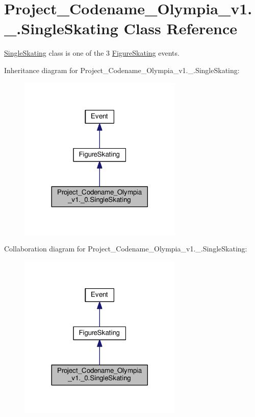 \hypertarget{classProject__Codename__Olympia__v1_1_1__0_1_1SingleSkating}{}\section{Project\+\_\+\+Codename\+\_\+\+Olympia\+\_\+v1.\+\_.\+Single\+Skating Class Reference}
\label{classProject__Codename__Olympia__v1_1_1__0_1_1SingleSkating}


\hyperlink{classProject__Codename__Olympia__v1_1_1__0_1_1SingleSkating}{Single\+Skating} class is one of the 3 \hyperlink{classProject__Codename__Olympia__v1_1_1__0_1_1FigureSkating}{Figure\+Skating} events.  




Inheritance diagram for Project\+\_\+\+Codename\+\_\+\+Olympia\+\_\+v1.\+\_.\+Single\+Skating\+:
\nopagebreak
\begin{figure}[H]
\begin{center}
\leavevmode
\includegraphics[width=221pt]{classProject__Codename__Olympia__v1_1_1__0_1_1SingleSkating__inherit__graph}
\end{center}
\end{figure}


Collaboration diagram for Project\+\_\+\+Codename\+\_\+\+Olympia\+\_\+v1.\+\_.\+Single\+Skating\+:
\nopagebreak
\begin{figure}[H]
\begin{center}
\leavevmode
\includegraphics[width=221pt]{classProject__Codename__Olympia__v1_1_1__0_1_1SingleSkating__coll__graph}
\end{center}
\end{figure}

